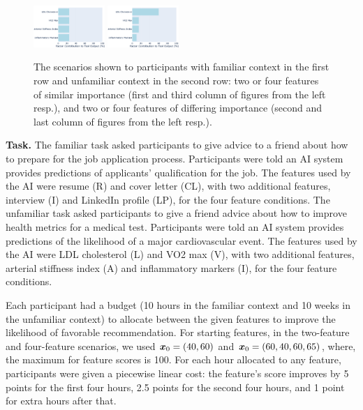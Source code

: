 \begin{figure}[ht]
    \includegraphics[width=0.24\textwidth]{Figures/4_unf_bal.png}
    \includegraphics[width=0.24\textwidth]{Figures/4_unf_unbal.png}
    
    \caption{The scenarios shown to participants with familiar context in the first row and unfamiliar context in the second row: two or four features of similar importance (first and third column of figures from the left resp.), and two or four features of differing importance (second and last column of figures from the left resp.).}
    \label{fig:feature-based-explanations}
\end{figure}


\noindent\textbf{Task.} The familiar task asked participants to give advice to a friend about how to prepare for the job application process. Participants were told an AI system provides predictions of applicants' qualification for the job. The features used by the AI were resume (R) and cover letter (CL), with two additional features, interview (I) and LinkedIn profile (LP), for the four feature conditions. The unfamiliar task asked participants to give a friend advice about how to improve health metrics for a medical test. Participants were told an AI system provides predictions of the likelihood of a major cardiovascular event. The features used by the AI were LDL cholesterol (L) and VO2 max (V), with two additional features, arterial stiffness index (A) and inflammatory markers (I), for the four feature conditions.

Each participant had a budget (10 hours in the familiar context and 10 weeks in the unfamiliar context) to allocate between the given features to improve the likelihood of favorable recommendation. For starting features, in the two-feature and four-feature scenarios, we used ${\bm{x}}_0=(40, 60)$ and ${\bm{x}}_0=(60, 40, 60, 65)$, where, the maximum for feature scores is 100. For each hour allocated to any feature, participants were given a piecewise linear cost: the feature's score improves by 5 points for the first four hours, 2.5 points for the second four hours, and 1 point for extra hours after that. 

